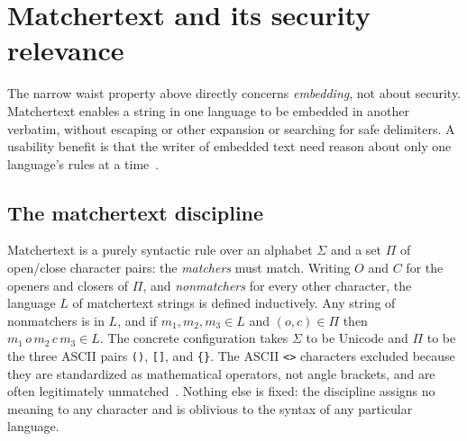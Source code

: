 \section{Matchertext and its security relevance}
\label{sec:relevance}

The narrow waist property above directly concerns \emph{embedding},
not about security.
Matchertext enables a string in one language to be
embedded in another verbatim,
without escaping or other expansion or searching for safe delimiters.
A usability benefit is that the writer of embedded text
need reason about only one language's rules at a time~\cite{matchertext}.

\subsection{The matchertext discipline}
\label{sec:relevance:discipline}

Matchertext is a purely syntactic rule over an alphabet $\Sigma$ and a set $\Pi$
of open/close character pairs: the \emph{matchers} must match.
Writing $O$ and $C$ for the openers and closers of $\Pi$, and \emph{nonmatchers}
for every other character, the language $L$ of matchertext strings is defined
inductively. Any string of nonmatchers is in $L$, and if $m_1,m_2,m_3\in L$ and
$(o,c)\in\Pi$ then $m_1\,o\,m_2\,c\,m_3\in L$.
The concrete configuration takes $\Sigma$ to be Unicode and $\Pi$ to be the
three ASCII pairs \verb|()|, \verb|[]|, and \verb|{}|.
The ASCII \verb|<>| characters excluded
because they are standardized as mathematical operators, not angle brackets,
and are often legitimately unmatched~\cite{matchertext}.
Nothing else is fixed: the discipline assigns no meaning to any character and is
oblivious to the syntax of any particular language.

